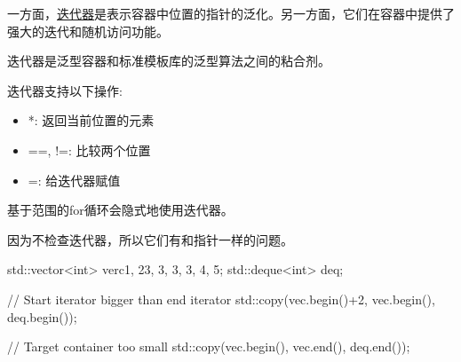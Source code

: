 
一方面，\href{http://en.cppreference.com/w/cpp/header/iterator}{迭代器}是表示容器中位置的指针的泛化。另一方面，它们在容器中提供了强大的迭代和随机访问功能。

迭代器是泛型容器和标准模板库的泛型算法之间的粘合剂。

迭代器支持以下操作:

\begin{itemize}
\item 
*: 返回当前位置的元素

\item 
==, !=: 比较两个位置

\item 
=: 给迭代器赋值
\end{itemize}

基于范围的for循环会隐式地使用迭代器。

因为不检查迭代器，所以它们有和指针一样的问题。

\begin{cpp}
std::vector<int> verc{1, 23, 3, 3, 3, 4, 5};
std::deque<int> deq;

// Start iterator bigger than end iterator
std::copy(vec.begin()+2, vec.begin(), deq.begin());

// Target container too small
std::copy(vec.begin(), vec.end(), deq.end());
\end{cpp}


































